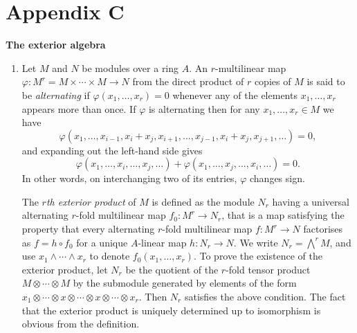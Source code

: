 \chapter*{Appendix C}
\renewcommand{\thetheorem}{C\arabic{theorem}}
\setcounter{theorem}{0}

\vspace*{-0.5cm}
\begin{center}
  {\Large\bfseries The exterior algebra}
\end{center}
\vspace{0.3cm}

\begin{enumerate}[(1)]
  \item Let $M$ and $N$ be modules over a ring $A$. An $r$-multilinear map
        $\varphi\colon M^r = M \times \cdots \times M \to N$ from the direct product of $r$ copies of
        $M$ is said to be \emph{alternating} if $\varphi(x_1, \ldots, x_r) = 0$ whenever any of the
        elements $x_1, \ldots, x_r$ appears more than once. If $\varphi$ is alternating then for
        any $x_1, \ldots, x_r \in M$ we have
        \[
          \varphi(x_1, \ldots, x_{i-1}, x_i + x_j, x_{i+1}, \ldots, x_{j-1}, x_i + x_j,
              x_{j+1}, \ldots) = 0,
        \]
        and expanding out the left-hand side gives
        \[
          \varphi(x_1, \ldots, x_i, \ldots, x_j, \ldots) + \varphi(x_1, \ldots, x_j, \ldots,
              x_i, \ldots) = 0.
        \]
        In other words, on interchanging two of its entries, $\varphi$ changes sign.

        The \emph{$r$th exterior product} of $M$ is defined as the module $N_r$ having a
        universal alternating $r$-fold multilinear map $f_0\colon M^r \to N_r$, that is a map
        satisfying the property that every alternating $r$-fold multilinear map
        $f\colon M^r \to N$ factorises as $f = h \circ f_0$ for a unique $A$-linear map
        $h\colon N_r \to N$. We write $N_r = \bigwedge^r M$, and use
        $x_1 \wedge \cdots \wedge x_r$ to denote $f_0(x_1, \ldots, x_r)$. To prove the existence of the
        exterior product, let $N_r$ be the quotient of the $r$-fold tensor product
        $M \otimes \cdots \otimes M$ by the submodule generated by elements of the form
        $x_1 \otimes \cdots \otimes x \otimes \cdots \otimes x \otimes \cdots \otimes x_r$. Then $N_r$ satisfies the above
        condition. The fact that the exterior product is uniquely determined up to
        isomorphism is obvious from the definition.


\end{enumerate}

